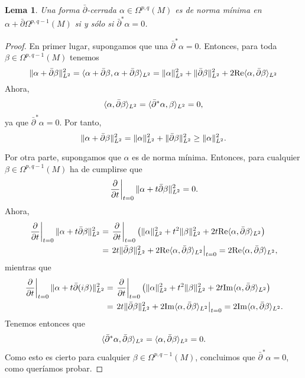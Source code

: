 \documentclass[12pt,a4paper]{article}
\newtheorem{lema}[thm]{Lema}
\theoremstyle{definition} \newtheorem{defn}[thm]{Definición}
\theoremstyle{definition} \newtheorem{ejemplo}[thm]{Ejemplo}
\theoremstyle{definition} \newtheorem{ejercicio}[thm]{Ejercicio}
\theoremstyle{remark} \newtheorem*{obs}{Observación}
\DeclarePairedDelimiter\norm{\lVert}{\rVert}
\DeclarePairedDelimiter\esc{\langle}{\rangle}
\newcommand{\dol}{\bar{\partial}}
\begin{document}
  \begin{lema}
    Una forma $\dol$-cerrada $\alpha \in \Omega^{p,q}(M)$ es de norma mínima en $\alpha + \dol \Omega^{p,q-1}(M)$ si y sólo si $\dol^*\alpha = 0$.
  \end{lema}
  \begin{proof}
    En primer lugar, supongamos que una $\dol^*\alpha = 0$. Entonces, para toda $\beta \in \Omega^{p,q-1}(M)$ tenemos
    \begin{equation*}
      \norm{\alpha+\dol \beta}_{L^2}^2=\esc{\alpha+\dol\beta,\alpha+\dol\beta}_{L^2}=\norm{\alpha}_{L^2}^2 + \norm{\dol \beta}_{L^2}^2 + 2 \mathrm{Re} \esc{\alpha, \dol\beta}_{L^2}
    \end{equation*}
    Ahora, 
    \begin{equation*}
      \esc{\alpha,\dol \beta}_{L^2}=\esc{\dol^* \alpha, \beta}_{L^2}=0,
    \end{equation*}
    ya que $\dol^*\alpha = 0$.
    Por tanto, 
    \begin{equation*}
      \norm{\alpha+\dol \beta}_{L^2}^2=\norm{\alpha}_{L^2}^2 + \norm{\dol \beta}_{L^2}^2 \geq \norm{\alpha}_{L^2}^2.
    \end{equation*}

    Por otra parte, supongamos que $\alpha$ es de norma mínima. Entonces, para cualquier $\beta \in \Omega^{p,q-1}(M)$ ha de cumplirse que
    \begin{equation*}
      \left. \frac{\partial}{\partial t}\right|_{t=0} \norm{\alpha + t \dol \beta}^2_{L^2}=0.
    \end{equation*}
  Ahora,
  \begin{align*}
    \left. \frac{\partial}{\partial t}\right|_{t=0} \norm{\alpha + t \dol \beta}^2_{L^2}&=\left. \frac{\partial}{\partial t}\right|_{t=0} \left( \norm{\alpha}_{L^2}^2 + t^2 \norm{\beta}_{L^2}^2 + 2t \mathrm{Re}\esc{\alpha,\dol \beta}_{L^2} \right)\\ &= \left. 2t \norm{\dol \beta}^2_{L^2} + 2 \mathrm{Re}\esc{\alpha,\dol \beta}_{L^2} \right|_{t=0} = 2 \mathrm{Re}\esc{\alpha,\dol \beta}_{L^2},
  \end{align*}
  mientras que
  \begin{align*}
    \left. \frac{\partial}{\partial t}\right|_{t=0} \norm{\alpha + t \dol (i\beta)}^2_{L^2}&=\left. \frac{\partial}{\partial t}\right|_{t=0} \left( \norm{\alpha}_{L^2}^2 + t^2 \norm{\beta}_{L^2}^2 + 2t \mathrm{Im}\esc{\alpha,\dol \beta}_{L^2} \right)\\ &= \left. 2t \norm{\dol \beta}^2_{L^2} + 2 \mathrm{Im}\esc{\alpha,\dol \beta}_{L^2} \right|_{t=0} = 2 \mathrm{Im}\esc{\alpha,\dol \beta}_{L^2}.
  \end{align*}
  Tenemos entonces que $$\esc{\dol^*\alpha, \dol \beta}_{L^2}=\esc{\alpha, \dol \beta}_{L^2}=0.$$
  Como esto es cierto para cualquier $\beta \in \Omega^{p,q-1}(M)$, concluimos que $\dol^*\alpha=0$, como queríamos probar.
  \end{proof}
\end{document}
